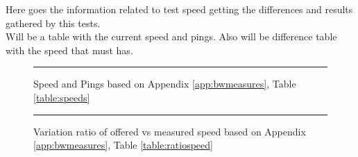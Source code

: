 Here goes the information related to test speed getting the differences and results gathered by this tests.\\

Will be a table with the current speed and pings. Also will be difference table with the speed that must has.\\

\begin{figure}[ht]
\begin{minipage}{6cm}
\centering
	\rule{5.5cm}{7.1cm}
\caption{Speed and Pings based on Appendix \ref{app:bwmeasures}, Table \ref{table:speeds}}
\label{fig:speeds}
\end{minipage}%
\end{figure}%

\begin{figure}[ht]
\begin{minipage}{6cm}
\centering
	\rule{5.5cm}{7.1cm}
\caption{Variation ratio of offered vs measured speed based on Appendix \ref{app:bwmeasures}, Table \ref{table:ratiospeed}}
\label{fig:ratiospeeds}
\end{minipage}%
\end{figure}%

